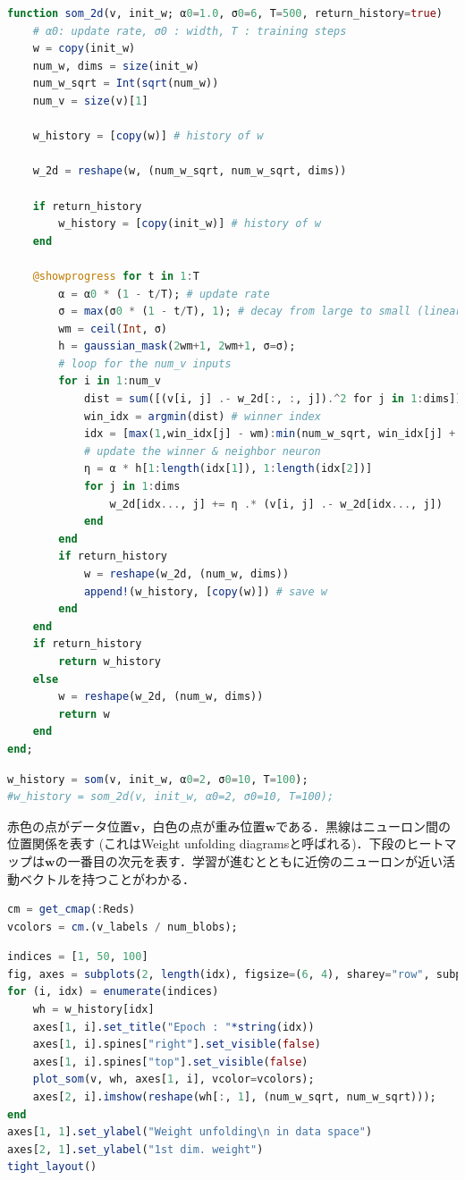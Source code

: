 \begin{lstlisting}[language=julia]
function som_2d(v, init_w; α0=1.0, σ0=6, T=500, return_history=true)
    # α0: update rate, σ0 : width, T : training steps
    w = copy(init_w)
    num_w, dims = size(init_w)
    num_w_sqrt = Int(sqrt(num_w))
    num_v = size(v)[1]
    
    w_history = [copy(w)] # history of w
    
    w_2d = reshape(w, (num_w_sqrt, num_w_sqrt, dims))
    
    if return_history
        w_history = [copy(init_w)] # history of w
    end
    
    @showprogress for t in 1:T
        α = α0 * (1 - t/T); # update rate
        σ = max(σ0 * (1 - t/T), 1); # decay from large to small (linearly decreased, avoid zero)
        wm = ceil(Int, σ)
        h = gaussian_mask(2wm+1, 2wm+1, σ=σ);
        # loop for the num_v inputs
        for i in 1:num_v
            dist = sum([(v[i, j] .- w_2d[:, :, j]).^2 for j in 1:dims]) # distance between input and neurons
            win_idx = argmin(dist) # winner index
            idx = [max(1,win_idx[j] - wm):min(num_w_sqrt, win_idx[j] + wm) for j in 1:2] # neighbor indices
            # update the winner & neighbor neuron
            η = α * h[1:length(idx[1]), 1:length(idx[2])]
            for j in 1:dims
                w_2d[idx..., j] += η .* (v[i, j] .- w_2d[idx..., j])
            end
        end
        if return_history
            w = reshape(w_2d, (num_w, dims))
            append!(w_history, [copy(w)]) # save w
        end
    end
    if return_history
        return w_history
    else
        w = reshape(w_2d, (num_w, dims))
        return w
    end
end;
\end{lstlisting}
\begin{lstlisting}[language=julia]
w_history = som(v, init_w, α0=2, σ0=10, T=100);
#w_history = som_2d(v, init_w, α0=2, σ0=10, T=100);
\end{lstlisting}
赤色の点がデータ位置$\mathbf{v}$，白色の点が重み位置$\mathbf{w}$である．黒線はニューロン間の位置関係を表す (これはWeight unfolding diagramsと呼ばれる)．下段のヒートマップは$\mathbf{w}$の一番目の次元を表す．学習が進むとともに近傍のニューロンが近い活動ベクトルを持つことがわかる．
\begin{lstlisting}[language=julia]
cm = get_cmap(:Reds) 
vcolors = cm.(v_labels / num_blobs);
\end{lstlisting}
\begin{lstlisting}[language=julia]
indices = [1, 50, 100]
fig, axes = subplots(2, length(idx), figsize=(6, 4), sharey="row", subplot_kw=Dict("box_aspect"=>1))
for (i, idx) = enumerate(indices)
    wh = w_history[idx]
    axes[1, i].set_title("Epoch : "*string(idx))
    axes[1, i].spines["right"].set_visible(false)
    axes[1, i].spines["top"].set_visible(false)
    plot_som(v, wh, axes[1, i], vcolor=vcolors);
    axes[2, i].imshow(reshape(wh[:, 1], (num_w_sqrt, num_w_sqrt)));
end
axes[1, 1].set_ylabel("Weight unfolding\n in data space")
axes[2, 1].set_ylabel("1st dim. weight")
tight_layout()
\end{lstlisting}
